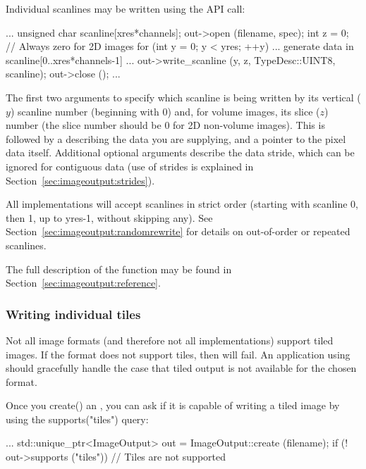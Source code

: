 Individual scanlines may be written using the \writescanline API
call:

\begin{code}
        ...
        unsigned char scanline[xres*channels];
        out->open (filename, spec);
        int z = 0;   // Always zero for 2D images
        for (int y = 0;  y < yres;  ++y) {
            ... generate data in scanline[0..xres*channels-1] ...
            out->write_scanline (y, z, TypeDesc::UINT8, scanline);
        }
        out->close ();
        ...
\end{code}

The first two arguments to \writescanline specify which scanline is
being written by its vertical ($y$) scanline number (beginning with 0)
and, for volume images, its slice ($z$) number (the slice number should
be 0 for 2D non-volume images).  This is followed by a \TypeDesc
describing the data you are supplying, and a pointer to the pixel data
itself.  Additional optional arguments describe the data stride, which
can be ignored for contiguous data (use of strides is explained in
Section~\ref{sec:imageoutput:strides}).

All \ImageOutput implementations will accept scanlines in strict order
(starting with scanline 0, then 1, up to {\kw yres-1}, without skipping
any).  See Section~\ref{sec:imageoutput:randomrewrite} for details
on out-of-order or repeated scanlines.

The full description of the \writescanline function may be found
in Section~\ref{sec:imageoutput:reference}.

\subsubsection{Writing individual tiles}

Not all image formats (and therefore not all \ImageOutput
implementations) support tiled images.  If the format does not support
tiles, then \writetile will fail.  An application using \product
should gracefully handle the case that tiled output is not available for
the chosen format.

Once you {\kw create()} an \ImageOutput, you can ask if it is capable
of writing a tiled image by using the {\kw supports("tiles")} query:

\begin{code}
        ...
        std::unique_ptr<ImageOutput> out = ImageOutput::create (filename);
        if (! out->supports ("tiles")) {
            // Tiles are not supported
        }
\end{code}

